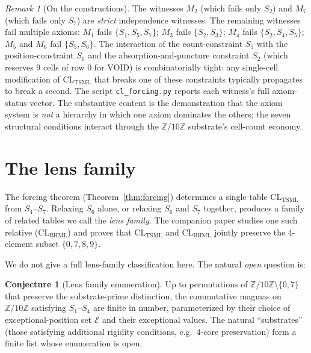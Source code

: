 \documentclass[11pt,reqno]{amsart}
\theoremstyle{plain}
\theoremstyle{definition}
\newtheorem{conjecture}[theorem]{Conjecture}
\theoremstyle{remark}
\newtheorem*{remark}{Remark}
\newcommand{\Z}{\mathbb{Z}}
\newcommand{\TSML}{\mathrm{TSML}}
\newcommand{\BHML}{\mathrm{BHML}}
\newcommand{\CL}{\mathrm{CL}}
\begin{document}
\begin{remark}[On the constructions]
The witnesses $M_{2}$ (which fails only $S_{2}$) and $M_{7}$ (which
fails only $S_{7}$) are \emph{strict} independence witnesses. The
remaining witnesses fail multiple axioms: $M_{1}$ fails
$\{S_{1}, S_{5}, S_{7}\}$; $M_{3}$ fails $\{S_{2}, S_{3}\}$; $M_{4}$
fails $\{S_{2}, S_{4}, S_{5}\}$; $M_{5}$ and $M_{6}$ fail
$\{S_{5}, S_{6}\}$. The interaction of the count-constraint $S_{5}$
with the position-constraint $S_{6}$ and the absorption-and-puncture
constraint $S_{2}$ (which reserves $9$ cells of row $0$ for VOID) is
combinatorially tight: any single-cell modification of
$\CL_{\TSML}$ that breaks one of these constraints typically
propagates to break a second. The script
\texttt{cl\_forcing.py} reports each witness's full axiom-status
vector. The substantive content is the demonstration that the
axiom system is \emph{not} a hierarchy in which one axiom dominates
the others; the seven structural conditions interact through the
$\Z/10\Z$ substrate's cell-count economy.
\end{remark}

\section{The lens family}
\label{sec:lens-family}

The forcing theorem (Theorem~\ref{thm:forcing}) determines a single
table $\CL_{\TSML}$ from $S_{1}$--$S_{7}$. Relaxing $S_{6}$ alone,
or relaxing $S_{6}$ and $S_{7}$ together, produces a family of
related tables we call the \emph{lens family}. The companion paper
\cite{SandersGishFourCore} studies one such relative ($\CL_{\BHML}$)
and proves that $\CL_{\TSML}$ and $\CL_{\BHML}$ jointly preserve the
$4$-element subset $\{0, 7, 8, 9\}$.

We do not give a full lens-family classification here. The natural
\emph{open} question is:

\begin{conjecture}[Lens family enumeration]
\label{conj:lens-family}
Up to permutations of $\Z/10\Z \setminus \{0, 7\}$ that preserve the
substrate-prime distinction, the commutative magmas on $\Z/10\Z$
satisfying $S_{1}$--$S_{4}$ are finite in number, parameterized by
their choice of exceptional-position set $\mathcal{E}$ and their
exceptional values. The natural ``substrates'' (those satisfying
additional rigidity conditions, e.g.\ $4$-core preservation) form a
finite list whose enumeration is open.
\end{conjecture}
\end{document}
